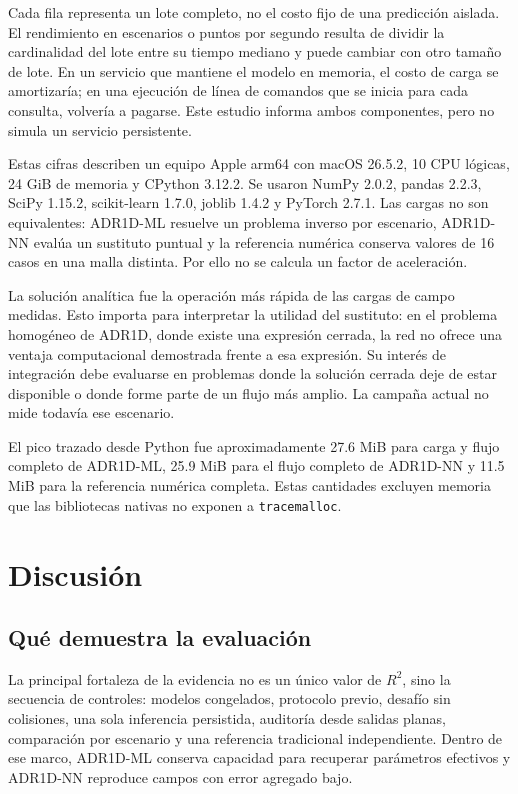 \documentclass[11pt,a4paper]{article}
\newcommand{\code}[1]{\texttt{#1}}
\begin{document}
Cada fila representa un lote completo, no el costo fijo de una predicción
aislada. El rendimiento en escenarios o puntos por segundo resulta de dividir
la cardinalidad del lote entre su tiempo mediano y puede cambiar con otro tamaño
de lote. En un servicio que mantiene el modelo en memoria, el costo de carga se
amortizaría; en una ejecución de línea de comandos que se inicia para cada
consulta, volvería a pagarse. Este estudio informa ambos componentes, pero no
simula un servicio persistente.

Estas cifras describen un equipo Apple arm64 con macOS 26.5.2, 10 CPU lógicas,
24 GiB de memoria y CPython 3.12.2. Se usaron NumPy 2.0.2, pandas 2.2.3,
SciPy 1.15.2, scikit-learn 1.7.0, joblib 1.4.2 y PyTorch 2.7.1. Las cargas no son
equivalentes: ADR1D-ML resuelve un problema inverso por escenario, ADR1D-NN
evalúa un sustituto puntual y la referencia numérica conserva valores de 16
casos en una malla distinta. Por ello no se calcula un factor de aceleración.

La solución analítica fue la operación más rápida de las cargas de campo
medidas. Esto importa para interpretar la utilidad del sustituto: en el problema
homogéneo de ADR1D, donde existe una expresión cerrada, la red no ofrece una
ventaja computacional demostrada frente a esa expresión. Su interés de
integración debe evaluarse en problemas donde la solución cerrada deje de estar
disponible o donde forme parte de un flujo más amplio. La campaña actual no
mide todavía ese escenario.

El pico trazado desde Python fue aproximadamente 27.6 MiB para carga y flujo
completo de ADR1D-ML, 25.9 MiB para el flujo completo de ADR1D-NN y 11.5 MiB
para la referencia numérica completa. Estas cantidades excluyen memoria que
las bibliotecas nativas no exponen a \code{tracemalloc}.

\section{Discusión}

\subsection{Qué demuestra la evaluación}

La principal fortaleza de la evidencia no es un único valor de $R^2$, sino la
secuencia de controles: modelos congelados, protocolo previo, desafío sin
colisiones, una sola inferencia persistida, auditoría desde salidas planas,
comparación por escenario y una referencia tradicional independiente. Dentro
de ese marco, ADR1D-ML conserva capacidad para recuperar parámetros efectivos
y ADR1D-NN reproduce campos con error agregado bajo.
\end{document}
